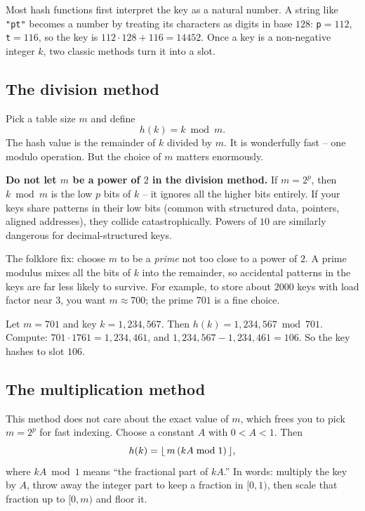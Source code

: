 Most hash functions first interpret the key as a natural number. A string like \lstinline|"pt"| becomes a number by treating its characters as digits in base $128$: \texttt{p}$=112$, \texttt{t}$=116$, so the key is $112 \cdot 128 + 116 = 14452$. Once a key is a non-negative integer $k$, two classic methods turn it into a slot.

\subsection{The division method}

Pick a table size $m$ and define
\[
  h(k) = k \bmod m.
\]
The hash value is the remainder of $k$ divided by $m$. It is wonderfully fast -- one modulo operation. But the choice of $m$ matters enormously.

\begin{trapbox}
\textbf{Do not let $m$ be a power of $2$ in the division method.} If $m = 2^p$, then $k \bmod m$ is the low $p$ bits of $k$ -- it ignores all the higher bits entirely. If your keys share patterns in their low bits (common with structured data, pointers, aligned addresses), they collide catastrophically. Powers of $10$ are similarly dangerous for decimal-structured keys.
\end{trapbox}

The folklore fix: choose $m$ to be a \emph{prime} not too close to a power of $2$. A prime modulus mixes all the bits of $k$ into the remainder, so accidental patterns in the keys are far less likely to survive. For example, to store about $2000$ keys with load factor near $3$, you want $m \approx 700$; the prime $701$ is a fine choice.

\begin{example}
Let $m = 701$ and key $k = 1{,}234{,}567$. Then $h(k) = 1{,}234{,}567 \bmod 701$. Compute: $701 \cdot 1761 = 1{,}234{,}461$, and $1{,}234{,}567 - 1{,}234{,}461 = 106$. So the key hashes to slot $106$.
\end{example}

\subsection{The multiplication method}

This method does not care about the exact value of $m$, which frees you to pick $m = 2^p$ for fast indexing. Choose a constant $A$ with $0 < A < 1$. Then
\[
  h(k) = \floor*{\, m \,(k A \bmod 1) \,},
\]
where $kA \bmod 1$ means ``the fractional part of $kA$.'' In words: multiply the key by $A$, throw away the integer part to keep a fraction in $[0,1)$, then scale that fraction up to $[0,m)$ and floor it.

